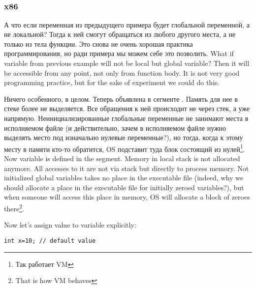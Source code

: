 \subsection{}
\subsubsection{x86}

\IFRU
{А что если переменная  из предыдущего примера будет глобальной переменной, а не локальной? 
Тогда к ней смогут обращаться из любого другого места, а не только из тела функции. 
Это снова не очень хорошая практика программирования, но ради примера мы можем себе это позволить.}
{What if  variable from previous example will not be local but global variable? 
Then it will be accessible from any point, not only from function body. 
It is not very good programming practice, but for the sake of experiment we could do this.}



\IFRU
{Ничего особенного, в целом. Теперь  объявлена в сегменте . 
Память для нее в стеке более не выделяется.
Все обращения к ней происходит не через стек, а уже напрямую. 
Неинициализированные глобальные переменные не занимают места в исполняемом файле
(и действительно, зачем в исполняемом файле
нужно выделять место под изначально нулевые переменные?), но тогда, когда к этому месту в памяти
кто-то обратится, \ac{OS} подставит туда блок состоящий из нулей\footnote{Так работает \ac{VM}}.}
{Now  variable is defined in the  segment. 
Memory in local stack is not allocated anymore. 
All accesses to it are not via stack but directly to process memory. 
Not initialized global variables takes no place in the executable file
(indeed, why we should allocate a place
in the executable file for initially zeroed variables?), but when someone will access this place
in memory, \ac{OS} will allocate a block of zeroes there\footnote{That is how \ac{VM} behaves}.}

{Now let's assign value to variable explicitly:}

\begin{lstlisting}
int x=10; // default value
\end{lstlisting}


